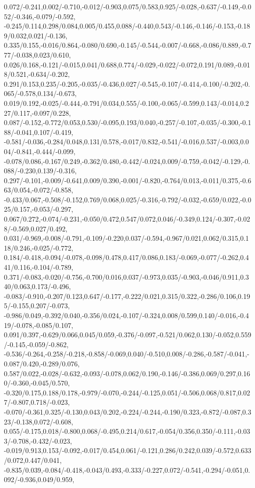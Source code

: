 {0.072/-0.241,0.002/-0.710,-0.012/-0.903,0.075/0.583,0.925/-0.028,-0.637/-0.149,-0.052/-0.346,-0.079/-0.592,%
-0.245/0.114,0.298/0.084,0.005/0.455,0.088/-0.440,0.543/-0.146,-0.146/-0.153,-0.189/0.032,0.021/-0.136,%
0.335/0.155,-0.016/0.864,-0.080/0.690,-0.145/-0.544,-0.007/-0.668,-0.086/0.889,-0.777/-0.038,0.023/0.610,%
0.026/0.168,-0.121/-0.015,0.041/0.688,0.774/-0.029,-0.022/-0.072,0.191/0.089,-0.018/0.521,-0.634/-0.202,%
0.291/0.153,0.235/-0.205,-0.035/-0.436,0.027/-0.545,-0.107/-0.414,-0.100/-0.202,-0.065/-0.578,0.134/-0.673,%
0.019/0.192,-0.025/-0.444,-0.791/0.034,0.555/-0.100,-0.065/-0.599,0.143/-0.014,0.227/0.117,-0.097/0.228,%
0.087/-0.152,-0.772/0.053,0.530/-0.095,0.193/0.040,-0.257/-0.107,-0.035/-0.300,-0.188/-0.041,0.107/-0.419,%
-0.581/-0.036,-0.284/0.048,0.131/0.578,-0.017/0.832,-0.541/-0.016,0.537/-0.003,0.004/-0.841,-0.444/-0.099,%
-0.078/0.086,-0.167/0.249,-0.362/0.480,-0.442/-0.024,0.009/-0.759,-0.042/-0.129,-0.088/-0.230,0.139/-0.316,%
0.297/-0.101,-0.009/-0.641,0.009/0.390,-0.001/-0.820,-0.764/0.013,-0.011/0.375,-0.663/0.054,-0.072/-0.858,%
-0.433/0.067,-0.508/-0.152,0.769/0.068,0.025/-0.316,-0.792/-0.032,-0.659/0.022,-0.025/0.157,-0.053/-0.297,%
0.067/0.272,-0.074/-0.231,-0.050/0.472,0.547/0.072,0.046/-0.349,0.124/-0.307,-0.028/-0.569,0.027/0.492,%
0.031/-0.969,-0.008/-0.791,-0.109/-0.220,0.037/-0.594,-0.967/0.021,0.062/0.315,0.118/0.246,-0.025/-0.772,%
0.184/-0.418,-0.094/-0.078,-0.098/0.478,0.417/0.086,0.183/-0.069,-0.077/-0.262,0.441/0.116,-0.104/-0.789,%
0.371/-0.083,-0.020/-0.756,-0.700/0.016,0.037/-0.973,0.035/-0.903,-0.046/0.911,0.340/0.063,0.173/-0.496,%
-0.083/-0.910,-0.207/0.123,0.647/-0.177,-0.222/0.021,0.315/0.322,-0.286/0.106,0.195/-0.155,0.207/-0.073,%
-0.986/0.049,-0.392/0.040,-0.356/0.024,-0.107/-0.324,0.008/0.599,0.140/-0.016,-0.419/-0.078,-0.085/0.107,%
0.091/0.397,-0.629/0.066,0.045/0.059,-0.376/-0.097,-0.521/0.062,0.130/-0.052,0.559/-0.145,-0.059/-0.862,%
-0.536/-0.264,-0.258/-0.218,-0.858/-0.069,0.040/-0.510,0.008/-0.286,-0.587/-0.041,-0.087/0.420,-0.289/0.076,%
0.587/0.022,-0.028/-0.632,-0.093/-0.078,0.062/0.190,-0.146/-0.386,0.069/0.297,0.160/-0.360,-0.045/0.570,%
-0.320/0.175,0.188/0.178,-0.979/-0.070,-0.244/-0.125,0.051/-0.506,0.068/0.817,0.027/-0.807,0.718/-0.023,%
-0.070/-0.361,0.325/-0.130,0.043/0.202,-0.224/-0.244,-0.190/0.323,-0.872/-0.087,0.323/-0.138,0.072/-0.608,%
0.055/-0.175,0.018/-0.800,0.068/-0.495,0.214/0.617,-0.054/0.356,0.350/-0.111,-0.033/-0.708,-0.432/-0.023,%
-0.019/0.913,0.153/-0.092,-0.017/0.454,0.061/-0.121,0.286/0.242,0.039/-0.572,0.633/0.072,0.447/0.041,%
-0.835/0.039,-0.084/-0.418,-0.043/0.493,-0.333/-0.227,0.072/-0.541,-0.294/-0.051,0.092/-0.936,0.049/0.959,%
}
